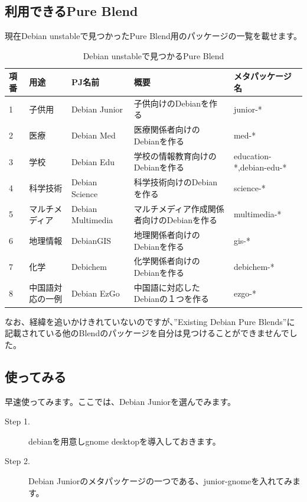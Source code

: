 \documentclass[mingoth,a4paper]{jsarticle}
\begin{document}
\subsection{利用できるPure Blend}

 現在Debian unstableで見つかったPure Blend用のパッケージの一覧を載せます。

\begin{table}[ht]
\begin{center}
\begin{tabular}{|l|l|l|p{5cm}|l|}
\hline 
項番&用途& PJ名前 & 概要&メタパッケージ名 \\ \hline \hline
1 & 子供用 & Debian Junior & 子供向けのDebianを作る & junior-* \\ \hline 
2 & 医療 & Debian Med  & 医療関係者向けのDebianを作る & med-* \\ \hline 
3 & 学校 & Debian Edu & 学校の情報教育向けのDebianを作る & education-*,debian-edu-* \\ \hline 
4 & 科学技術 & Debian Science & 科学技術向けのDebianを作る & science-* \\ \hline 
5 & マルチメディア & Debian Multimedia & マルチメディア作成関係者向けのDebianを作る & multimedia-* \\ \hline 
6 & 地理情報 & DebianGIS & 地理関係者向けのDebianを作る & gis-* \\ \hline 
7 & 化学 & Debichem & 化学関係者向けのDebianを作る & debichem-* \\ \hline 
8 & 中国語対応の一例 & Debian EzGo & 中国語に対応したDebianの１つを作る & ezgo-* \\ \hline 
\end{tabular}
\label{tab:debian-blend-package}
\caption{Debian unstableで見つかるPure Blend}
\end{center}
\end{table}

 なお、経緯を追いかけきれていないのですが、''Existing Debian Pure Blends''に記載されている他のBlendのパッケージ\cite{debian-existing-blends}を自分は見つけることができませんでした。

\subsection{使ってみる}

 早速使ってみます。ここでは、Debian Juniorを選んでみます。

\begin{description}
\item [Step 1.] debianを用意しgnome desktopを導入しておきます。
\item [Step 2.] Debian Juniorのメタパッケージの一つである、junior-gnomeを入れてみます。
\end{description}
\end{document}
